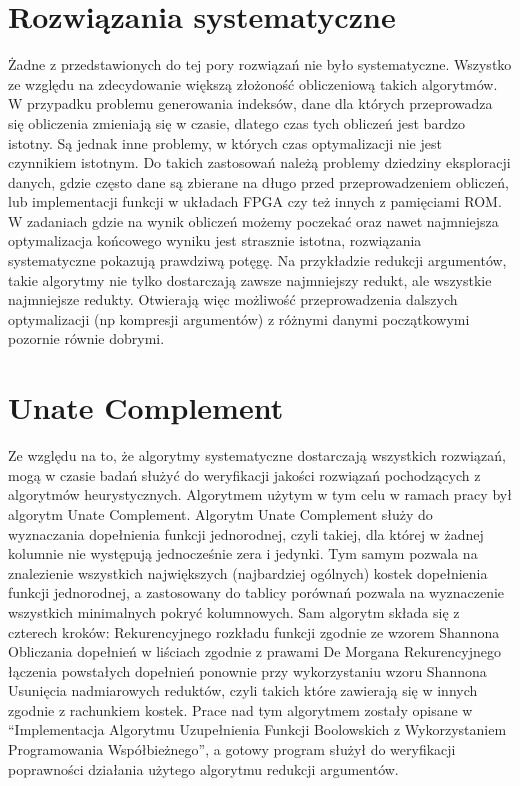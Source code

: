 \section{Rozwiązania systematyczne}

Żadne z przedstawionych do tej pory rozwiązań nie było systematyczne.
Wszystko ze względu na zdecydowanie większą złożoność obliczeniową takich algorytmów.
W przypadku problemu generowania indeksów, dane dla których przeprowadza się obliczenia zmieniają się w czasie, dlatego czas tych obliczeń jest bardzo istotny.
Są jednak inne problemy, w których czas optymalizacji nie jest czynnikiem istotnym.
Do takich zastosowań należą problemy dziedziny eksploracji danych, gdzie często dane są zbierane na długo przed przeprowadzeniem obliczeń, lub implementacji funkcji w układach FPGA czy też innych z pamięciami ROM.
W zadaniach gdzie na wynik obliczeń możemy poczekać oraz nawet najmniejsza optymalizacja końcowego wyniku jest strasznie istotna, rozwiązania systematyczne pokazują prawdziwą potęgę.
Na przykładzie redukcji argumentów, takie algorytmy nie tylko dostarczają zawsze najmniejszy redukt, ale wszystkie najmniejsze redukty.
Otwierają więc możliwość przeprowadzenia dalszych optymalizacji (np kompresji argumentów) z różnymi danymi początkowymi pozornie równie dobrymi.

\section{Unate Complement}

Ze względu na to, że algorytmy systematyczne dostarczają wszystkich rozwiązań, mogą w czasie badań służyć do weryfikacji jakości rozwiązań pochodzących z algorytmów heurystycznych.
Algorytmem użytym w tym celu w ramach pracy był algorytm Unate Complement.
Algorytm Unate Complement służy do wyznaczania dopełnienia funkcji jednorodnej, czyli takiej, dla której w żadnej kolumnie nie występują jednocześnie zera i jedynki.
Tym samym pozwala na znalezienie wszystkich największych (najbardziej ogólnych) kostek dopełnienia funkcji jednorodnej, a zastosowany do tablicy porównań pozwala na wyznaczenie wszystkich minimalnych pokryć kolumnowych.
Sam algorytm składa się z czterech kroków:
Rekurencyjnego rozkładu funkcji zgodnie ze wzorem Shannona
Obliczania dopełnień w liściach zgodnie z prawami De Morgana
Rekurencyjnego łączenia powstałych dopełnień ponownie przy wykorzystaniu wzoru Shannona
Usunięcia nadmiarowych reduktów, czyli takich które zawierają się w innych zgodnie z rachunkiem kostek.
Prace nad tym algorytmem zostały opisane w “Implementacja Algorytmu Uzupełnienia Funkcji Boolowskich z Wykorzystaniem Programowania Współbieżnego”, a gotowy program służył do weryfikacji poprawności działania użytego algorytmu redukcji argumentów.
